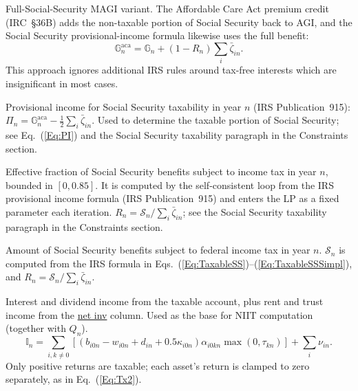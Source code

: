 \documentclass[fleqn,12pt]{report}
\newcommand{\code}[1]{\url{#1}}
\begin{document}
\begin{description}[leftmargin=4em,style=multiline]
\item [$\mathbb{G}^{\mathrm{aca}}_n$]
	Full-Social-Security MAGI variant. The Affordable Care Act premium credit
	(IRC~§36B) adds the non-taxable portion of Social Security back to AGI, and the
	Social Security provisional-income formula likewise uses the full benefit:
	\begin{equation}
		\mathbb{G}^{\mathrm{aca}}_n = \mathbb{G}_n + (1 - R_n)\sum_i \bar{\zeta}_{in}.
	\end{equation}
	This approach ignores additional IRS rules around tax-free interests which are
	insignificant in most cases.

\item [$\Pi_n$]
	Provisional income for Social Security taxability in year $n$ (IRS Publication~915):
	$\Pi_n = \mathbb{G}^{\mathrm{aca}}_n - \tfrac{1}{2}\sum_i\bar{\zeta}_{in}$.
	Used to determine the taxable portion of Social Security; see Eq.~(\ref{Eq:PI})
	and the Social Security taxability paragraph in the Constraints section.

\item [$R_n$]
	Effective fraction of Social Security benefits subject to income tax in year $n$,
	bounded in $[0, 0.85]$.
	It is computed by the self-consistent loop from the IRS provisional income
	formula (IRS Publication~915) and enters the LP as a fixed parameter each iteration.
	$R_n = \mathcal{S}_n / \sum_i\bar{\zeta}_{in}$;
	see the Social Security taxability paragraph in the Constraints section.

\item [$\mathcal{S}_n$]
	Amount of Social Security benefits subject to federal income tax in year $n$.
	$\mathcal{S}_n$ is computed from the IRS formula in Eqs.~(\ref{Eq:TaxableSS})--(\ref{Eq:TaxableSSSimpl}),
	and $R_n = \mathcal{S}_n / \sum_i\bar{\zeta}_{in}$.

\item [$\mathbb{I}_n$]
	Interest and dividend income from the taxable account, plus rent and trust income from the \code{net inv} column.
	Used as the base for NIIT computation (together with $Q_n$).
	\begin{equation}
		\mathbb{I}_n = \sum_{i,k\neq 0} [(b_{i0n} - w_{i0n} + d_{in}
		     + 0.5\kappa_{i0n})\alpha_{i0kn}\max(0, \tau_{kn})] + \sum_i \nu_{in}.
	\end{equation}
	Only positive returns are taxable; each asset's return is clamped to zero
	separately, as in Eq.~(\ref{Eq:Tx2}).


\end{description}
\end{document}
